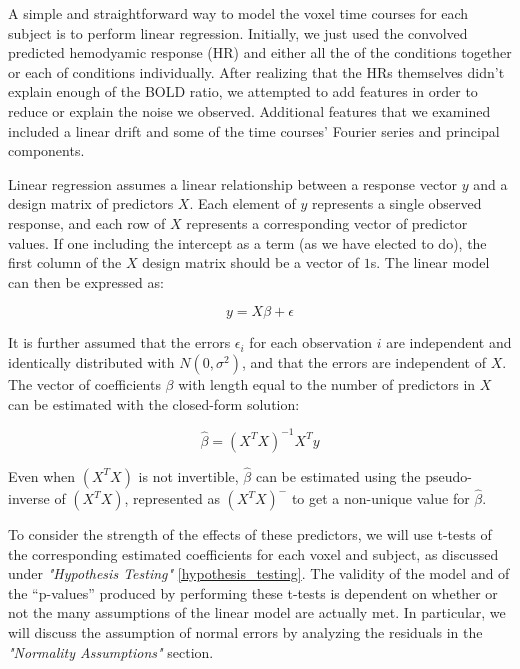 
\par \indent A simple and straightforward way to model the voxel time courses 
for each subject is to perform linear regression. Initially, we just used the 
convolved predicted hemodyamic response (HR) and either all the of the 
conditions together or each of conditions individually. After realizing that 
the HRs themselves didn't explain enough of the BOLD ratio, we attempted to 
add features in order to reduce or explain the noise we observed. Additional 
features that we examined included a linear drift and some of the time 
courses' Fourier series and principal components.

\par Linear regression assumes a linear relationship between a response 
vector $y$ and a design matrix of predictors $X$. Each element of $y$ 
represents a single observed response, and each row of $X$ represents a 
corresponding vector of predictor values. If one including the intercept as a 
term (as we have elected to do), the first column of the $X$ design matrix 
should be a vector of $1$s. The linear model can then be expressed as: 

\begin{equation}
y = X\beta + \epsilon
\end{equation}

\par It is further assumed that the errors $\epsilon_i$ for each observation 
$i$ are independent and identically distributed with $N(0, \sigma^2)$, and 
that the errors are independent of $X$. The vector of coefficients $\beta$ 
with length equal to the number of predictors in $X$ can be estimated with 
the closed-form solution:

\begin{equation}
\hat{\beta} =(X^T X)^{-1} X^T y
\end{equation}

\par Even when $(X^T X)$ is not invertible, $\hat{\beta}$ can be estimated 
using the pseudo-inverse of $(X^T X)$, represented as $(X^T X)^{-}$ to get a 
non-unique value for $\hat{\beta}$.

\par To consider the strength of the effects of these predictors, we will use 
t-tests of the corresponding estimated coefficients for each voxel and 
subject, as discussed under \textit{"Hypothesis Testing"} \ref{hypothesis_testing}. The validity of the model and of the ``p-values'' produced by performing 
these t-tests is dependent on whether or not the many assumptions of the 
linear model are actually met. In particular, we will discuss the assumption 
of normal errors by analyzing the residuals in the \textit{"Normality Assumptions"} section. 

